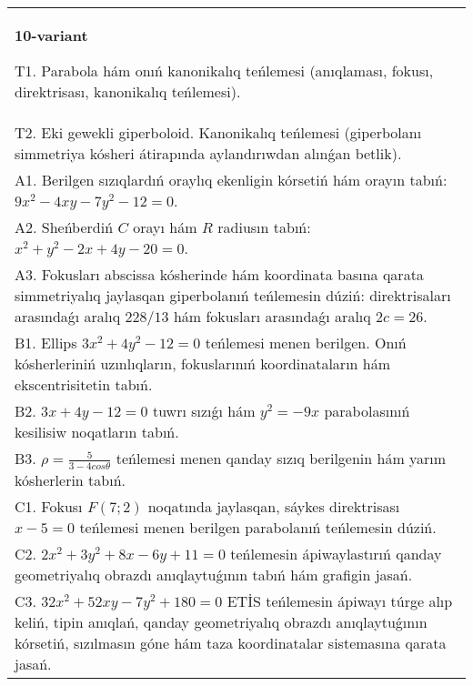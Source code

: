 \documentclass{article}
\begin{document}
\begin{tabular}{m{17cm}}
\textbf{10-variant}
\newline

T1. Parabola hám onıń kanonikalıq teńlemesi (anıqlaması, fokusı, direktrisası, kanonikalıq teńlemesi).\\

T2. Eki gewekli giperboloid. Kanonikalıq teńlemesi (giperbolanı simmetriya kósheri átirapında aylandırıwdan alınǵan betlik).\\

A1. Berilgen sızıqlardıń oraylıq ekenligin kórsetiń hám orayın tabıń: $9 x^{2}-4 xy-7 y^{2}-12=0$.\\

A2. Sheńberdiń $C$ orayı hám $R$ radiusın tabıń: $x^2+y^2-2 x+4 y-20=0$.\\

A3. Fokusları abscissa kósherinde hám koordinata basına qarata simmetriyalıq jaylasqan giperbolanıń teńlemesin dúziń: direktrisaları arasındaǵı aralıq $228/13$ hám fokusları arasındaǵı aralıq $2 c=26$.\\

B1. Ellips $3x^{2} + 4y^{2} - 12 = 0$ teńlemesi menen berilgen. Onıń kósherleriniń uzınlıqların, fokuslarınıń koordinataların hám ekscentrisitetin tabıń.  \\

B2. $3x + 4y - 12 = 0$ tuwrı sızıǵı hám $y^{2} = - 9x$ parabolasınıń kesilisiw noqatların tabıń.  \\

B3. $\rho = \frac{5}{3 - 4cos\theta}$ teńlemesi menen qanday sızıq berilgenin hám yarım kósherlerin tabıń.  \\

C1. Fokusı $F(7;2)$ noqatında jaylasqan, sáykes direktrisası $x - 5 = 0$ teńlemesi menen berilgen parabolanıń teńlemesin dúziń.  \\

C2. $2x^{2} + 3y^{2} + 8x - 6y + 11 = 0$ teńlemesin ápiwaylastırıń qanday geometriyalıq obrazdı anıqlaytuǵının tabıń hám grafigin jasań.\\

C3. $32x^{2} + 52xy - 7y^{2} + 180 = 0$ ETİS teńlemesin ápiwayı túrge alıp keliń, tipin anıqlań, qanday geometriyalıq obrazdı anıqlaytuǵının kórsetiń, sızılmasın góne hám taza koordinatalar sistemasına qarata jasań.  \\

\end{tabular}
\vspace{1cm}
\end{document}
